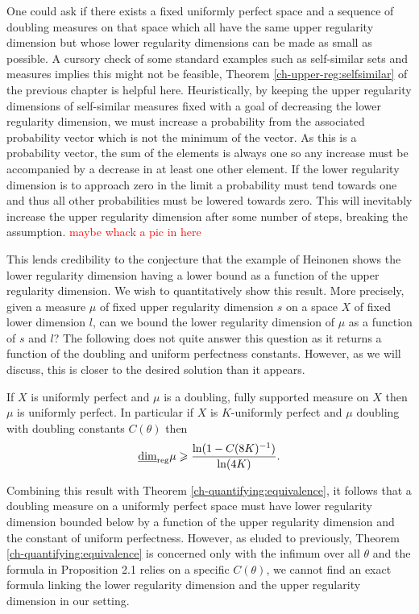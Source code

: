 One could ask if there exists a fixed uniformly perfect space and a sequence of doubling measures on that space which all have the same upper regularity dimension but whose lower regularity dimensions can be made as small as possible. A cursory check of some standard examples such as self-similar sets and measures implies this might not be feasible, Theorem \ref{ch-upper-reg:selfsimilar} of the previous chapter is helpful here. Heuristically, by keeping the upper regularity dimensions of self-similar measures fixed with a goal of decreasing the lower regularity dimension, we must increase a probability from the associated probability vector which is not the minimum of the vector. As this is a probability vector, the sum of the elements is always one so any increase must be accompanied by a decrease in at least one other element. If the lower regularity dimension is to approach zero in the limit a probability must tend towards one and thus all other probabilities must be lowered towards zero. This will inevitably increase the upper regularity dimension after some number of steps, breaking the assumption.
\textcolor{red}{maybe whack a pic in here}

This lends credibility to the conjecture that the example of Heinonen shows the lower regularity dimension having a lower bound as a function of the upper regularity dimension. We wish to quantitatively show this result. More precisely, given a measure $\mu$ of fixed upper regularity dimension $s$ on a space $X$ of fixed lower dimension $l$, can we bound the lower regularity dimension of $\mu$ as a function of $s$ and $l$? The following does not quite answer this question as it returns a function of the doubling and uniform perfectness constants. However, as we will discuss, this is closer to the desired solution than it appears.

\begin{proposition}
	If $X$ is uniformly perfect and $\mu$ is a doubling, fully supported measure on $X$ then $\mu$ is uniformly perfect. In particular if $X$ is $K$-uniformly perfect and $\mu$ doubling with doubling constants $C(\theta)$ then  
	$$\underline{\dim}_{\textup{reg}} \mu \geqslant \frac{\ln(1-C(8K)^{-1})}{\ln(4K)} .$$  
\end{proposition}


Combining this result with Theorem \ref{ch-quantifying:equivalence}, it follows that a doubling measure on a uniformly perfect space must have lower regularity dimension bounded below by a function of the upper regularity dimension and the constant of uniform perfectness. However, as eluded to previously, Theorem \ref{ch-quantifying:equivalence} is concerned only with the infimum over all $\theta$ and the formula in Proposition 2.1 relies on a specific $C(\theta)$, we cannot find an exact formula linking the lower regularity dimension and the upper regularity dimension in our setting.


